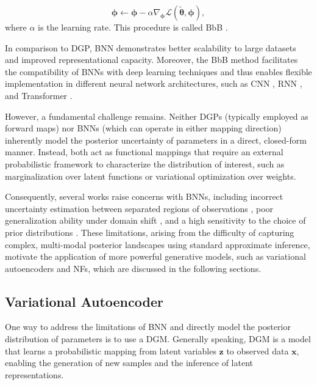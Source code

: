 \begin{equation}
    \boldsymbol{\phi}\leftarrow\boldsymbol{\phi}-\alpha\nabla_{\boldsymbol{\phi}}\mathcal{L}(\tilde{\boldsymbol{\theta}}, \boldsymbol{\phi}),
\end{equation}
where $\alpha$ is the learning rate. This procedure is called \ac{BbB} \citep{blundell2015bbb}.

In comparison to \ac{DGP}, \ac{BNN} demonstrates better scalability to large datasets and improved representational capacity. Moreover, the \ac{BbB} method facilitates the compatibility of \acp{BNN} with deep learning techniques and thus enables flexible implementation in different neural network architectures, such as \ac{CNN} \citep{shridhar2019bcnn}, \ac{RNN} \citep{fortunato2019brnn}, and Transformer \citep{müller2024transbi}.

However, a fundamental challenge remains. Neither \acp{DGP} (typically employed as forward maps) nor \acp{BNN} (which can operate in either mapping direction) inherently model the posterior uncertainty of parameters in a direct, closed-form manner. Instead, both act as functional mappings that require an external probabilistic framework to characterize the distribution of interest, such as marginalization over latent functions or variational optimization over weights.

Consequently, several works raise concerns with BNNs, including incorrect uncertainty estimation between separated regions of observations \citep{foong2019inbetween, foong2020bnn}, poor generalization ability under domain shift \citep{izmailov2021bnnp}, and a high sensitivity to the choice of prior distributions \citep{silvestro2020prior}. These limitations, arising from the difficulty of capturing complex, multi-modal posterior landscapes using standard approximate inference, motivate the application of more powerful generative models, such as variational autoencoders and \acp{NF}, which are discussed in the following sections.

\subsection{Variational Autoencoder}
One way to address the limitations of \ac{BNN} and directly model the posterior distribution of parameters is to use a \ac{DGM}. Generally speaking, \ac{DGM} is a model that learns a probabilistic mapping from latent variables $\boldsymbol{z}$ to observed data $\boldsymbol{x}$, enabling the generation of new samples and the inference of latent representations.

